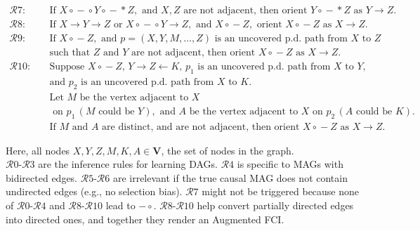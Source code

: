 \documentclass[main.tex]{subfiles}
\begin{document}
\begin{align*}
\mathcal{R}7: \quad & \text{If } X \circ\!\!-\!\!\circ Y \circ\!\!-\!\!\ast Z, \text{ and } X, Z \text{ are not adjacent, then orient } Y \circ\!\!-\!\!\ast Z \text{ as } Y \rightarrow Z. \\[1em]
\mathcal{R}8: \quad & \text{If } X \rightarrow Y \rightarrow Z \text{ or } X \circ\!\!-\!\!\circ Y \rightarrow Z, \text{ and } X \circ\!\!-\!\!Z, \text{ orient } X \circ\!\!-\!\!Z \text{ as } X \rightarrow Z. \\[1em]
\mathcal{R}9: \quad & \text{If } X \circ\!\!-\!\!Z, \text{ and } p = (X, Y, M, \ldots, Z) \text{ is an uncovered p.d. path from } X \text{ to } Z \\
& \text{such that } Z \text{ and } Y \text{ are not adjacent, then orient } X \circ\!\!-\!\!Z \text{ as } X \rightarrow Z. \\[1em]
\mathcal{R}10: \quad & \text{Suppose } X \circ\!\!-\!\!Z,\, Y \rightarrow Z \leftarrow K,\, p_1 \text{ is an uncovered p.d. path from } X \text{ to } Y, \\
& \text{and } p_2 \text{ is an uncovered p.d. path from } X \text{ to } K. \\
& \text{Let } M \text{ be the vertex adjacent to }X \\ & \text{ on } p_1\, (M \text{ could be } Y), \text{ and } A \text{ be the vertex adjacent to } X \text{ on } p_2\, (A \text{ could be } K). \\
& \text{If } M \text{ and } A \text{ are distinct, and are not adjacent, then orient } X \circ\!\!-\!\!Z \text{ as } X \rightarrow Z.
\end{align*}

\noindent
Here, all nodes \( X, Y, Z, M, K, A \in \mathbf{V} \), the set of nodes in the graph.\\
\(\mathcal{R}0\)-\(\mathcal{R}3\) are the inference rules for learning DAGs. \(\mathcal{R}4\) is specific to MAGs with bidirected edges. \(\mathcal{R}5\)-\(\mathcal{R}6\) are irrelevant if the true causal MAG does not contain undirected edges (e.g., no selection bias). \(\mathcal{R}7\) might not be triggered because none of \(\mathcal{R}0\)-\(\mathcal{R}4\) and \(\mathcal{R}8\)-\(\mathcal{R}10\) lead to \( -\!\!\circ \). \(\mathcal{R}8\)-\(\mathcal{R}10\) help convert partially directed edges into directed ones, and together they render an Augmented FCI.


\end{document}
